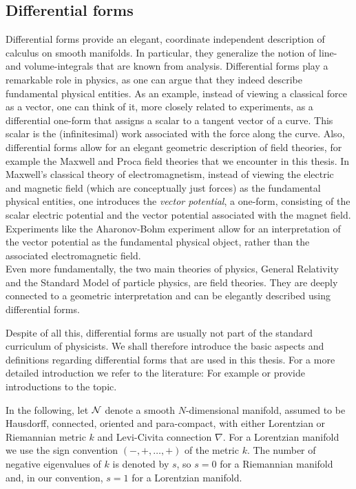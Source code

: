 \subsection{Differential forms}\label{sec:differential_forms}
%
%
Differential forms provide an elegant, coordinate independent description of calculus on smooth manifolds. In particular, they generalize the notion of line- and volume-integrals that are known from analysis. Differential forms play a remarkable role in physics, as one can argue that they indeed describe fundamental physical entities. As an example, instead of viewing a classical force as a vector, one can think of it, more closely related to experiments, as a differential one-form that assigns a scalar to a tangent vector of a curve. This scalar is the (infinitesimal) work associated with the force along the curve. Also, differential forms allow for an elegant geometric description of field theories, for example the Maxwell and Proca field theories that we encounter in this thesis. In Maxwell's classical theory of electromagnetism, instead of viewing the electric and magnetic field (which are conceptually just forces) as the fundamental physical entities, one introduces the \emph{vector potential}, a one-form, consisting of the scalar electric potential and the vector potential associated with the magnet field. Experiments like the Aharonov-Bohm experiment allow for an interpretation of the vector potential as the fundamental physical object, rather than the associated electromagnetic field. \\
Even more fundamentally, the two main theories of physics, General Relativity and the Standard Model of particle physics, are field theories. They are deeply connected to a geometric interpretation and can be elegantly described using differential forms. \par
%
%
Despite of all this, differential forms are usually not part of the standard curriculum of physicists. We shall therefore introduce the basic aspects and definitions regarding differential forms that are used in this thesis. For a more detailed introduction we refer to the literature: For example \cite[Chapter 2 and 4]{rudolph_schmidt} or \cite[Appendix B]{wald_GR} provide introductions to the topic.\par
%
%
In the following, let $\mathcal{N}$ denote a smooth $N$-dimensional manifold, assumed to be Hausdorff, connected, oriented and para-compact, with either Lorentzian or Riemannian metric $k$ and Levi-Civita connection $\nabla$. For a Lorentzian manifold we use the sign convention $(-,+,\dots,+)$ of the metric $k$. The number of negative eigenvalues of $k$ is denoted by $s$, so $s=0$ for a Riemannian manifold and, in our convention, $s=1$ for a Lorentzian manifold.
